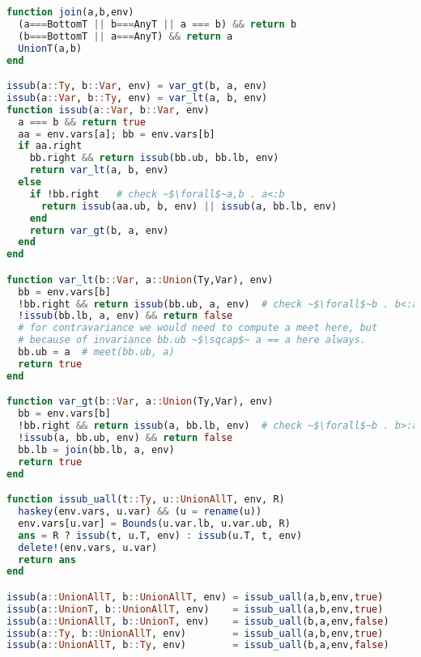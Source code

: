 \begin{singlespace}
\begin{lstlisting}[language=julia]
function join(a,b,env)
  (a===BottomT || b===AnyT || a === b) && return b
  (b===BottomT || a===AnyT) && return a
  UnionT(a,b)
end

issub(a::Ty, b::Var, env) = var_gt(b, a, env)
issub(a::Var, b::Ty, env) = var_lt(a, b, env)
function issub(a::Var, b::Var, env)
  a === b && return true
  aa = env.vars[a]; bb = env.vars[b]
  if aa.right
    bb.right && return issub(bb.ub, bb.lb, env)
    return var_lt(a, b, env)
  else
    if !bb.right   # check ~$\forall$~a,b . a<:b
      return issub(aa.ub, b, env) || issub(a, bb.lb, env)
    end
    return var_gt(b, a, env)
  end
end

function var_lt(b::Var, a::Union(Ty,Var), env)
  bb = env.vars[b]
  !bb.right && return issub(bb.ub, a, env)  # check ~$\forall$~b . b<:a
  !issub(bb.lb, a, env) && return false
  # for contravariance we would need to compute a meet here, but
  # because of invariance bb.ub ~$\sqcap$~ a == a here always.
  bb.ub = a  # meet(bb.ub, a)
  return true
end

function var_gt(b::Var, a::Union(Ty,Var), env)
  bb = env.vars[b]
  !bb.right && return issub(a, bb.lb, env)  # check ~$\forall$~b . b>:a
  !issub(a, bb.ub, env) && return false
  bb.lb = join(bb.lb, a, env)
  return true
end

function issub_uall(t::Ty, u::UnionAllT, env, R)
  haskey(env.vars, u.var) && (u = rename(u))
  env.vars[u.var] = Bounds(u.var.lb, u.var.ub, R)
  ans = R ? issub(t, u.T, env) : issub(u.T, t, env)
  delete!(env.vars, u.var)
  return ans
end

issub(a::UnionAllT, b::UnionAllT, env) = issub_uall(a,b,env,true)
issub(a::UnionT, b::UnionAllT, env)    = issub_uall(a,b,env,true)
issub(a::UnionAllT, b::UnionT, env)    = issub_uall(b,a,env,false)
issub(a::Ty, b::UnionAllT, env)        = issub_uall(a,b,env,true)
issub(a::UnionAllT, b::Ty, env)        = issub_uall(b,a,env,false)

\end{lstlisting}
\end{singlespace}
